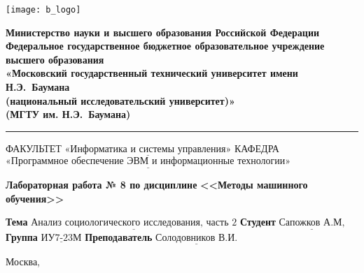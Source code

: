 \thispagestyle{empty}

\noindent \begin{minipage}{0.15\textwidth}
	\texttt{[image: b\_logo]}
\end{minipage}
\noindent\begin{minipage}{0.85\textwidth}\centering
	\textbf{Министерство науки и высшего образования Российской Федерации}\\
	\textbf{Федеральное государственное бюджетное образовательное учреждение высшего образования}\\
	\textbf{«Московский государственный технический университет имени Н.Э.~Баумана}\\
	\textbf{(национальный исследовательский университет)»}\\
	\textbf{(МГТУ им. Н.Э.~Баумана)}
\end{minipage}

\noindent\rule{\linewidth}{3pt}
\newline\newline
\noindent ФАКУЛЬТЕТ $\underline{\text{«Информатика и системы управления»}}$ \newline\newline
\noindent КАФЕДРА $\underline{\text{«Программное обеспечение ЭВМ и информационные технологии»}}$

\vspace{1cm}

\begin{center}
	\noindent\begin{minipage}{1.3\textwidth}\centering
		\Large\textbf{  Лабораторная работа № 8 по дисциплине}\newline
		\textbf{<<Методы машинного обучения>>}\newline
	\end{minipage}
\end{center}

\noindent\textbf{Тема} $\underline{\text{Анализ социологического исследования, часть 2}}$\newline\newline
\noindent\textbf{Студент} $\underline{\text{Сапожков А.М,}}$\newline\newline
\noindent\textbf{Группа} $\underline{\text{ИУ7-23М}}$\newline\newline
\noindent\textbf{Преподаватель} $\underline{\text{Солодовников В.И.}}$\newline

\begin{center}
	\vfill
	Москва,~\the\year
\end{center}
\clearpage
